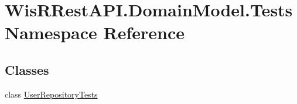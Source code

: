 \hypertarget{namespace_wis_r_rest_a_p_i_1_1_domain_model_1_1_tests}{}\section{Wis\+R\+Rest\+A\+P\+I.\+Domain\+Model.\+Tests Namespace Reference}
\label{namespace_wis_r_rest_a_p_i_1_1_domain_model_1_1_tests}
\subsection*{Classes}
\begin{DoxyCompactItemize}
\item 
class \hyperlink{class_wis_r_rest_a_p_i_1_1_domain_model_1_1_tests_1_1_user_repository_tests}{User\+Repository\+Tests}
\end{DoxyCompactItemize}
